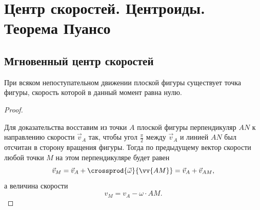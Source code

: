 \section{Центр скоростей. Центроиды. Теорема Пуансо}

\subsection{Мгновенный центр скоростей}

\begin{theorem}
  При всяком непоступательном движении плоской фигуры существует точка фигуры,
  скорость которой в данный момент равна нулю.
\end{theorem}

\begin{proof}
  \begin{figure}[H]
    \centering

    \caption{}
    \label{fig:17_1}
  \end{figure}

  Для доказательства восставим из точки $A$ плоской фигуры перпендикуляр $AN$ к
  направлению скорости $\vec{v}_A$ так, чтобы угол $\frac{\pi}{2}$ между
  $\vec{v}_A$ и линией $AN$ был отсчитан в сторону вращения фигуры. Тогда по
  предыдущему вектор скорости любой точки $M$ на этом перпендикуляре будет равен
  \begin{equation*}
    \vec{v}_M = \vec{v}_A + \crossprod{\vec{\omega}}{\vv{AM}} = \vec{v}_A +
      \vec{v}_{AM},
  \end{equation*}
  а величина скорости
  \begin{equation*}
    v_M = v_A - \omega \cdot AM.
  \end{equation*}


\end{proof}
